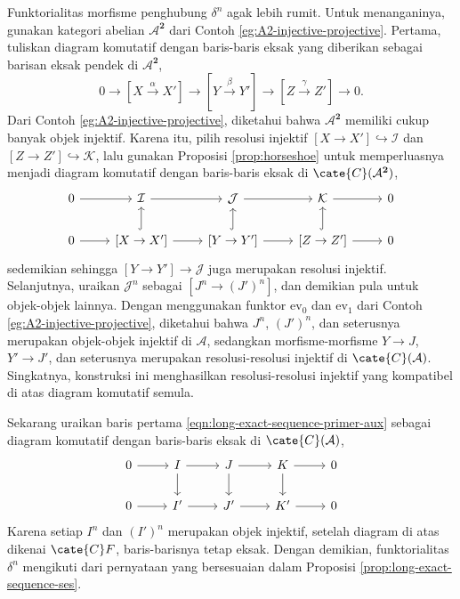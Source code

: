 \begin{bukti}
	Funktorialitas morfisme penghubung $\delta^n$ agak lebih rumit. Untuk menanganinya, gunakan kategori abelian $\mathcal{A}^{\mathbf{2}}$ dari Contoh \ref{eg:A2-injective-projective}. Pertama, tuliskan diagram komutatif dengan baris-baris eksak yang diberikan sebagai barisan eksak pendek di $\mathcal{A}^{\mathbf{2}}$,
	\[ 0 \to [X \xrightarrow{\alpha} X'] \to [Y \xrightarrow{\beta} Y'] \to [Z \xrightarrow{\gamma} Z'] \to 0. \]
	Dari Contoh \ref{eg:A2-injective-projective}, diketahui bahwa $\mathcal{A}^{\mathbf{2}}$ memiliki cukup banyak objek injektif. Karena itu, pilih resolusi injektif $[X \to X'] \hookrightarrow \mathcal{I}$ dan $[Z \to Z'] \hookrightarrow \mathcal{K}$, lalu gunakan Proposisi \ref{prop:horseshoe} untuk memperluasnya menjadi diagram komutatif dengan baris-baris eksak di $\cate{C}(\mathcal{A}^{\mathbf{2}})$,
	\begin{equation}\label{eqn:long-exact-sequence-primer-aux}\begin{tikzcd}
		0 \arrow[r] & \mathcal{I} \arrow[r] & \mathcal{J} \arrow[r] & \mathcal{K} \arrow[r] & 0 \\
		0 \arrow[r] & {[X \to X']} \arrow[r] \arrow[hookrightarrow, u] & {[Y \to Y']} \arrow[r] \arrow[hookrightarrow, u] & {[Z \to Z']} \arrow[r] \arrow[hookrightarrow, u] & 0
	\end{tikzcd}\end{equation}
	sedemikian sehingga $[Y \to Y'] \to \mathcal{J}$ juga merupakan resolusi injektif. Selanjutnya, uraikan $\mathcal{J}^n$ sebagai $[J^n \to (J')^n]$, dan demikian pula untuk objek-objek lainnya. Dengan menggunakan funktor $\mathrm{ev}_0$ dan $\mathrm{ev}_1$ dari Contoh \ref{eg:A2-injective-projective}, diketahui bahwa $J^n$, $(J')^n$, dan seterusnya merupakan objek-objek injektif di $\mathcal{A}$, sedangkan morfisme-morfisme $Y \to J$, $Y' \to J'$, dan seterusnya merupakan resolusi-resolusi injektif di $\cate{C}(\mathcal{A})$. Singkatnya, konstruksi ini menghasilkan resolusi-resolusi injektif yang kompatibel di atas diagram komutatif semula.
	
	Sekarang uraikan baris pertama \eqref{eqn:long-exact-sequence-primer-aux} sebagai diagram komutatif dengan baris-baris eksak di $\cate{C}(\mathcal{A})$,
	\[\begin{tikzcd}
		0 \arrow[r] & I \arrow[d] \arrow[r] & J \arrow[d] \arrow[r] & K \arrow[d] \arrow[r] & 0 \\
		0 \arrow[r] & I' \arrow[r] & J' \arrow[r] & K' \arrow[r] & 0
	\end{tikzcd}\]
	Karena setiap $I^n$ dan $(I')^n$ merupakan objek injektif, setelah diagram di atas dikenai $\cate{C}F$, baris-barisnya tetap eksak. Dengan demikian, funktorialitas $\delta^n$ mengikuti dari pernyataan yang bersesuaian dalam Proposisi \ref{prop:long-exact-sequence-ses}.
\end{bukti}

